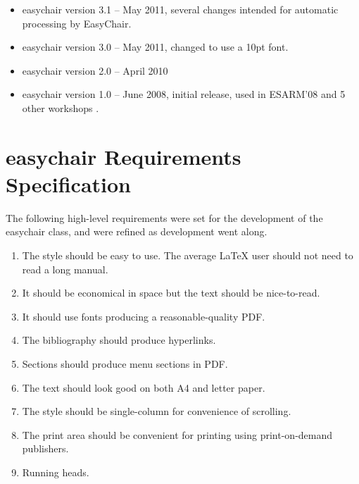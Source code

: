 \documentclass{imav2013}
\newcommand{\easychair}{\textsf{easychair}}
\begin{document}
\begin{itemize}
\item
{\easychair} version 3.1 -- May 2011, several changes intended for
automatic processing by EasyChair.

\item
{\easychair} version 3.0 -- May 2011, changed to use a 10pt font.

\item
{\easychair} version 2.0 -- April 2010

\item
{\easychair} version 1.0 -- June 2008, initial release, used in ESARM'08 \cite{esarm-08,esarm-08-proceedings}
and 5 other workshops \cite{easychair}.

\end{itemize}

%
\label{sect:bib}

%
%
%


\appendix
\section{{\easychair} Requirements Specification}
\label{sect:easychair-requirements}

The following high-level requirements were set for the development of 
the {\easychair} class, and were refined as development went along.

\begin{enumerate}
\item
The style should be easy to use. 
The average {\LaTeX} user should not need to read a long manual.

\item
It should be economical in space but the text should be nice-to-read.

\item
It should use fonts producing a reasonable-quality PDF.

\item
The bibliography should produce hyperlinks.

\item
Sections should produce menu sections in PDF.

\item
The text should look good on both A4 and letter paper.

\item
The style should be single-column for convenience of scrolling.

\item
The print area should be convenient for printing using print-on-demand publishers.

\item
Running heads.
\end{enumerate}
\end{document}
